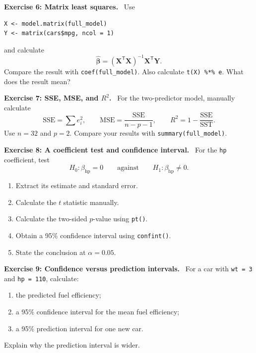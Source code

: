 \documentclass[11pt]{article}
\newenvironment{exercise}[1]
 {\par\medskip\noindent\color{navy}\textbf{Exercise #1.}\color{black}\ }
 {\par\medskip}
\begin{document}
\begin{exercise}{6: Matrix least squares}
Use
\begin{lstlisting}
X <- model.matrix(full_model)
Y <- matrix(cars$mpg, ncol = 1)
\end{lstlisting}
and calculate
\[
 \widehat{\boldsymbol\beta}
 =(\mathbf X^{\mathsf T}\mathbf X)^{-1}
   \mathbf X^{\mathsf T}\mathbf Y.
\]
Compare the result with \texttt{coef(full\_model)}. Also calculate
\texttt{t(X) \%*\% e}. What does the result mean?
\end{exercise}

\begin{exercise}{7: SSE, MSE, and $R^2$}
For the two-predictor model, manually calculate
\[
 \mathrm{SSE}=\sum e_i^2,
 \qquad
 \mathrm{MSE}=\frac{\mathrm{SSE}}{n-p-1},
 \qquad
 R^2=1-\frac{\mathrm{SSE}}{\mathrm{SST}}.
\]
Use $n=32$ and $p=2$. Compare your results with
\texttt{summary(full\_model)}.
\end{exercise}

\begin{exercise}{8: A coefficient test and confidence interval}
For the \texttt{hp} coefficient, test
\[
 H_0:\beta_{\mathrm{hp}}=0
 \qquad\text{against}\qquad
 H_1:\beta_{\mathrm{hp}}\ne0.
\]
\begin{enumerate}[label=(\alph*),leftmargin=*]
 \item Extract its estimate and standard error.
 \item Calculate the $t$ statistic manually.
 \item Calculate the two-sided $p$-value using \texttt{pt()}.
 \item Obtain a 95\% confidence interval using \texttt{confint()}.
 \item State the conclusion at $\alpha=0.05$.
\end{enumerate}
\end{exercise}

\begin{exercise}{9: Confidence versus prediction intervals}
For a car with \texttt{wt = 3} and \texttt{hp = 110}, calculate:
\begin{enumerate}[label=(\alph*),leftmargin=*]
 \item the predicted fuel efficiency;
 \item a 95\% confidence interval for the mean fuel efficiency;
 \item a 95\% prediction interval for one new car.
\end{enumerate}
Explain why the prediction interval is wider.
\end{exercise}
\end{document}

